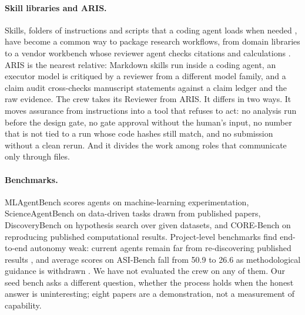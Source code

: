 \documentclass[11pt]{article}
\begin{document}
\paragraph{Skill libraries and ARIS.} Skills, folders of instructions and scripts that a
coding agent loads when needed \citep{agentskills}, have become a common
way to package research workflows, from domain libraries \citep{kdense2025skills} to a
vendor workbench whose reviewer agent checks citations and calculations
\citep{anthropic2026claudescience}. ARIS \citep{aris,yang2026aris} is the nearest
relative: Markdown skills run inside a coding agent, an executor model is critiqued by a
reviewer from a different model family, and a claim audit cross-checks manuscript
statements against a claim ledger and the raw evidence. The crew takes its Reviewer from
ARIS. It differs in two ways. It moves assurance from instructions into a tool that
refuses to act: no analysis run before the design gate, no gate approval without the
human's input, no number that is not tied to a run whose code hashes still match, and no
submission without a clean rerun. And it divides the work among roles that communicate
only through files.

\paragraph{Benchmarks.} MLAgentBench \citep{huang2024mlagentbench} scores agents on
machine-learning experimentation, ScienceAgentBench \citep{chen2025scienceagentbench} on
data-driven tasks drawn from published papers, DiscoveryBench
\citep{majumder2025discoverybench} on hypothesis search over given datasets, and
CORE-Bench \citep{siegel2024corebench} on reproducing published computational results.
Project-level benchmarks find end-to-end autonomy weak: current agents remain far from
re-discovering published results \citep{xu2026researchclawbench}, and average scores on
ASI-Bench fall from 50.9 to 26.6 as methodological guidance is withdrawn
\citep{zhou2026asibench}. We have not evaluated the crew on any of them. Our seed bench
asks a different question, whether the process holds when the honest answer is
uninteresting; eight papers are a demonstration, not a measurement of capability.
\end{document}
